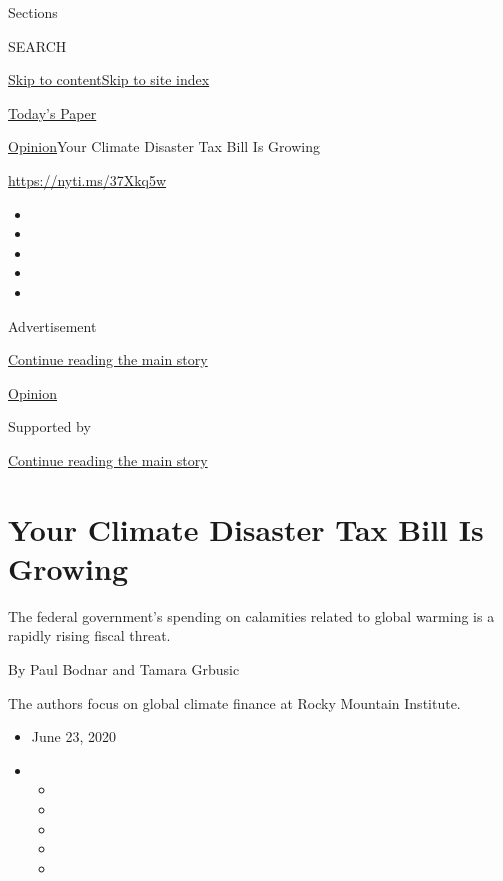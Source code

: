 Sections

SEARCH

\protect\hyperlink{site-content}{Skip to
content}\protect\hyperlink{site-index}{Skip to site index}

\href{https://myaccount.nytimes.com/auth/login?response_type=cookie\&client_id=vi}{}

\href{https://www.nytimes.com/section/todayspaper}{Today's Paper}

\href{/section/opinion}{Opinion}\textbar{}Your Climate Disaster Tax Bill
Is Growing

\href{https://nyti.ms/37Xkq5w}{https://nyti.ms/37Xkq5w}

\begin{itemize}
\item
\item
\item
\item
\item
\end{itemize}

Advertisement

\protect\hyperlink{after-top}{Continue reading the main story}

\href{/section/opinion}{Opinion}

Supported by

\protect\hyperlink{after-sponsor}{Continue reading the main story}

\hypertarget{your-climate-disaster-tax-bill-is-growing}{%
\section{Your Climate Disaster Tax Bill Is
Growing}\label{your-climate-disaster-tax-bill-is-growing}}

The federal government's spending on calamities related to global
warming is a rapidly rising fiscal threat.

By Paul Bodnar and Tamara Grbusic

The authors focus on global climate finance at Rocky Mountain Institute.

\begin{itemize}
\item
  June 23, 2020
\item
  \begin{itemize}
  \item
  \item
  \item
  \item
  \item
  \end{itemize}
\end{itemize}

